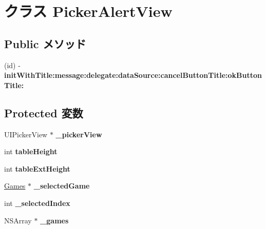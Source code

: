 \hypertarget{interface_picker_alert_view}{
\section{クラス PickerAlertView}
\label{interface_picker_alert_view}
}
\subsection*{Public メソッド}
\begin{DoxyCompactItemize}
\item 
\hypertarget{interface_picker_alert_view_aeab9bea3a278c79473d39f3629cb2086}{
(id) -\/ {\bfseries initWithTitle:message:delegate:dataSource:cancelButtonTitle:okButtonTitle:}}
\label{interface_picker_alert_view_aeab9bea3a278c79473d39f3629cb2086}

\end{DoxyCompactItemize}
\subsection*{Protected 変数}
\begin{DoxyCompactItemize}
\item 
\hypertarget{interface_picker_alert_view_ac6ab5a8efa26a138210a589cf97cb100}{
UIPickerView $\ast$ {\bfseries \_\-pickerView}}
\label{interface_picker_alert_view_ac6ab5a8efa26a138210a589cf97cb100}

\item 
\hypertarget{interface_picker_alert_view_af2caafc519c0336de1ac6de573d423de}{
int {\bfseries tableHeight}}
\label{interface_picker_alert_view_af2caafc519c0336de1ac6de573d423de}

\item 
\hypertarget{interface_picker_alert_view_a0845fa121c597e715efb4e12f453ebf4}{
int {\bfseries tableExtHeight}}
\label{interface_picker_alert_view_a0845fa121c597e715efb4e12f453ebf4}

\item 
\hypertarget{interface_picker_alert_view_aab39face826d7df8983d9aac6536902b}{
\hyperlink{interface_games}{Games} $\ast$ {\bfseries \_\-selectedGame}}
\label{interface_picker_alert_view_aab39face826d7df8983d9aac6536902b}

\item 
\hypertarget{interface_picker_alert_view_ad5d635bc54b01c1d367c228b43f644c7}{
int {\bfseries \_\-selectedIndex}}
\label{interface_picker_alert_view_ad5d635bc54b01c1d367c228b43f644c7}

\item 
\hypertarget{interface_picker_alert_view_aa9d7283bd9c6374ee63ac8017032c40d}{
NSArray $\ast$ {\bfseries \_\-games}}
\label{interface_picker_alert_view_aa9d7283bd9c6374ee63ac8017032c40d}

\end{DoxyCompactItemize}

